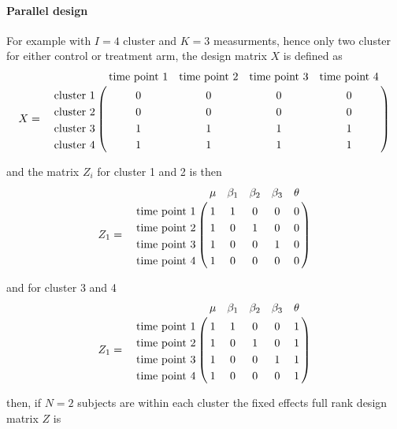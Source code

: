\documentclass{article}
\begin{document}
\paragraph{Parallel design}

For example with $I=4$ cluster and $K=3$ measurments, hence only two cluster for either control or treatment arm, the design matrix $X$ is defined as
\begin{eqnarray*}
  X &=&  \bordermatrix{
      			& \textrm{time point 1}	& \textrm{time point 2} & \textrm{time point 3} & \textrm{time point 4} \cr
\textrm{cluster 1} 	& 0&0	&0&0\cr
\textrm{cluster 2}	& 0&0	&0&0\cr
\textrm{cluster 3}  & 1&1	&1&1\cr
\textrm{cluster 4}  & 1&1  &1&1\cr
}
\end{eqnarray*}


and the matrix $Z_{i}$ for cluster 1 and 2 is then 
\begin{eqnarray*}
Z_{1} &=&  \bordermatrix{
  						& \mu	&\beta_{1}	& \beta_{2}	& \beta_{3}  &\theta\cr
\textrm{time point 1} 	& 1		&1			&0		 	& 0& 0\cr
\textrm{time point 2} 	&1 		&0 			&1			& 0& 0\cr
\textrm{time point 3}	&1 		&0			&0			& 1& 0\cr
\textrm{time point 4}  &1 		&0			&0		&0	& 0\cr
}
\end{eqnarray*}

and for cluster 3 and 4 
\begin{eqnarray*}
Z_{1} &=&  \bordermatrix{
    					& \mu	&\beta_{1}	& \beta_{2}	& \beta_{3}  &\theta\cr
\textrm{time point 1} 	& 1		&1			&0		 	& 0& 1\cr
\textrm{time point 2} 	&1 		&0 			&1			& 0& 1\cr
\textrm{time point 3}	&1 		&0			&0			& 1& 1\cr
\textrm{time point 4}  &1 		&0			&0		&0	& 1\cr
}
\end{eqnarray*}

then, if $N=2$ subjects are within each cluster the fixed effects full rank design matrix $Z$ is 
\end{document}
